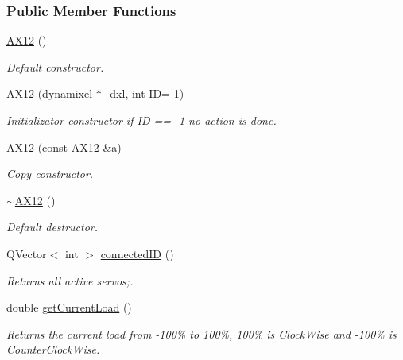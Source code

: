 \subsubsection*{Public Member Functions}
\begin{DoxyCompactItemize}
\item 
\hyperlink{a00001_ab7c557985e755d6119e5e2d979f928ae}{A\+X12} ()
\begin{DoxyCompactList}\small\item\em Default constructor. \end{DoxyCompactList}\item 
\hyperlink{a00001_a205be9b4dde785bd40b88f575a64f4d8}{A\+X12} (\hyperlink{a00004}{dynamixel} $\ast$\hyperlink{a00001_a16df7ccc0a8d3c585a93b6916734bb17}{\+\_\+dxl}, int \hyperlink{a00001_a08d272b502d65464202a3aa97825aec0ab2565d5698c9d943a8bcecf02b1389ad}{I\+D}=-\/1)
\begin{DoxyCompactList}\small\item\em Initializator constructor if I\+D == -\/1 no action is done. \end{DoxyCompactList}\item 
\hyperlink{a00001_a37b76666533323ec317f5156dbef2a89}{A\+X12} (const \hyperlink{a00001}{A\+X12} \&a)
\begin{DoxyCompactList}\small\item\em Copy constructor. \end{DoxyCompactList}\item 
\hyperlink{a00001_a5e9382e65479cdcb248f5303ac4c96d9}{$\sim$\+A\+X12} ()
\begin{DoxyCompactList}\small\item\em Default destructor. \end{DoxyCompactList}\item 
Q\+Vector$<$ int $>$ \hyperlink{a00001_a2fa05296aa57896a5cb0ef4ce0aa96f1}{connected\+I\+D} ()
\begin{DoxyCompactList}\small\item\em Returns all active servos;. \end{DoxyCompactList}\item 
double \hyperlink{a00001_a0bd930c81b7a9c088ecab789b3a7e525}{get\+Current\+Load} ()
\begin{DoxyCompactList}\small\item\em Returns the current load from -\/100\% to 100\%, 100\% is Clock\+Wise and -\/100\% is Counter\+Clock\+Wise. \end{DoxyCompactList}\item 

\end{DoxyCompactItemize}
